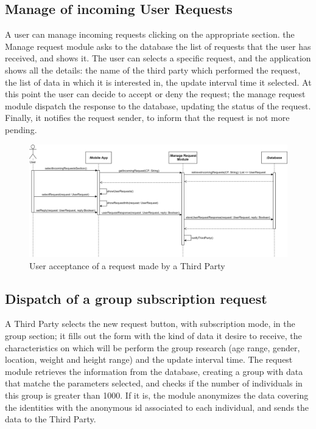 \subsection{Manage of incoming User Requests}
A user can manage incoming requests clicking on the appropriate section. the Manage request module asks to the database the list of requests that the user has received, and shows it. The user can selects a specific request, and the application shows all the details:
the name of the third party which performed the request, the list of data in which it is interested in, the update interval time it selected. At this point the user can decide to accept or deny the request; the manage request module dispatch the response to the database, updating the status of the request. Finally, it notifies the request sender, to inform that the request is not more pending. 

\begin{figure}[H]
    \centering
    \includegraphics[scale=0.15]{DD/Pictures/acceptRequest.png}
    \caption{User acceptance of a request made by a Third Party}
\end{figure}

\subsection{Dispatch of a group subscription request }
A Third Party selects the new request button, with subscription mode, in the group section; it fills out the form with the kind of data it desire to receive, the characteristics on which will be perform the group research (age range, gender, location, weight and height range) and the update interval time. The request module retrieves the information from the database, creating a group with data that matche the parameters selected, and checks if the number of individuals in this group is greater than 1000. If it is, the module anonymizes the data covering the identities with the anonymous id associated to each individual, and sends the data to the Third Party.


